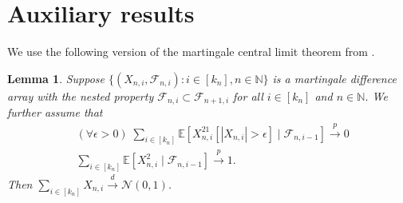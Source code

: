 \documentclass[11pt]{article}
\newtheorem{lem}{Lemma}
\begin{document}
\section{Auxiliary results}
We use the following version of the martingale central limit theorem from \citet[Corollary 3.1]{hall1980}. 
\begin{lem}
\label{lem:mclt}
    Suppose $\{(X_{n,i}, \mathcal{F}_{n,i}) : i\in [k_n], n\in \mathbb{N}\}$ is a martingale difference array with the nested property $\mathcal{F}_{n,i}\subset \mathcal{F}_{n+1, i}$ for all $i\in[k_n]$ and $n\in \mathbb{N}$. We further assume that
    \begin{align}
        & (\forall \epsilon >0)\; \sum_{i\in[k_n]}\mathbb{E}[X_{n,i}^21[|X_{n,i}|> \epsilon]\mid \mathcal{F}_{n, i-1}]\overset{p}{\rightarrow} 0 \tag{Lindeberg} \label{eq: Lindeberg}\\
        & \sum_{i\in [k_n]}\mathbb{E}\left[X_{n,i}^2\mid \mathcal{F}_{n,i-1}\right] \overset{p}{\rightarrow} 1. \tag{QV}\label{eq: QV}
    \end{align}
    Then $\sum_{i\in [k_n]}X_{n,i}\overset{d}{\rightarrow}\mathcal{N}(0,1)$. 
\end{lem}
\newpage

% 
\end{document}
